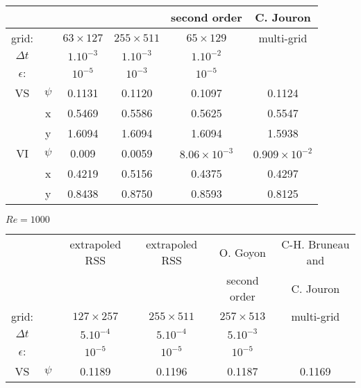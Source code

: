 {\begin{table}[!ht]
\begin{center}
\begin{tabular}{ |  c|c|c|c|c|c | }
                &             &                  &                  & second order              & C. Jouron \cite{BruneauJouron}\\ 
\hline 
grid:      &             & $63 \times 127$  & $255 \times 511$ & $65 \times 129$       & multi-grid \\ 
\hline 
$\Delta t$ &        &       $1.10^{-3}$                &            $1.10^{-3}$            &        $1.10^{-2}$                           & \\
\hline 
$\epsilon$:         &             & $10^{-5}$        & $10^{-3}$        &        $10^{-5}$               & \\ 
\hline 
VS              & $\psi$      & 0.1131           & 0.1120           & 0.1097                & 0.1124\\ 

                & x           & 0.5469           & 0.5586           & 0.5625                & 0.5547\\ 

                & y           & 1.6094           & 1.6094           & 1.6094                & 1.5938\\ 
\hline 
VI              & $\psi$      & 0.009            & 0.0059           & $8.06 \times 10^{-3}$ & $0.909 \times 10^{-2}$\\ 

                & x           & 0.4219           & 0.5156           & 0.4375                & 0.4297\\ 
                
                & y           & 0.8438           & 0.8750           & 0.8593                & 0.8125\\ 
\hline
\end{tabular} 

\vspace{0.5cm}


$Re=1000$

\begin{tabular}{|  c|c|c|c|c|c | }
\hline 
                &             &  extrapoled RSS    &  extrapoled RSS    & O. Goyon \cite{Goyon} & C-H. Bruneau and \\  

                &             &                  &                  & second order               & C. Jouron \cite{BruneauJouron}\\ 
\hline 
grid:      &             & $127 \times 257$ & $255 \times 511$ & $257 \times 513$      & multi-grid \\ 
\hline
$\Delta t$ &        &       $5.10^{-4}$                &            $5.10^{-4}$            &        $5.10^{-3}$                           & \\
\hline 
$\epsilon$:         &             & $10^{-5}$        & $10^{-5}$        &      $10^{-5}$                 & \\ 
\hline 
VS              & $\psi$      & 0.1189           &  0.1196          & 0.1187                & 0.1169\\ 


\end{tabular}
\end{center}
\end{table}}
